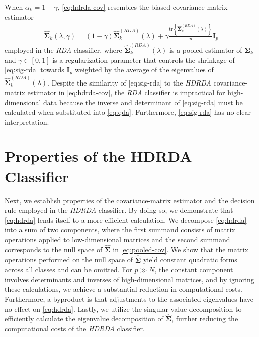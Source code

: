 \documentclass[]{interact}\usepackage[]{graphicx}\usepackage[]{color}
\newcommand{\tr}{\text{tr}}
\begin{document}
When $\alpha_k = 1 - \gamma$, \eqref{eq:hdrda-cov} resembles the biased covariance-matrix estimator
\begin{align}
    \widehat{\bm \Sigma}_k(\lambda, \gamma) = (1 - \gamma) \widehat{\bm \Sigma}_k^{(RDA)}(\lambda) + \gamma \frac{\tr\left\{\widehat{\bm \Sigma}_k^{(RDA)}(\lambda)\right\}}{p} \bm I_p \label{eq:sig-rda}
\end{align}
employed in the \emph{RDA} classifier, where $\widehat{\bm
  \Sigma}_k^{(RDA)}(\lambda)$ is a pooled estimator of $\bm \Sigma_k$ and
$\gamma \in [0, 1]$ is a regularization parameter that controls the shrinkage of
\eqref{eq:sig-rda} towards $\bm I_p$ weighted by the average of the eigenvalues
of $\widehat{\bm \Sigma}_k^{(RDA)}(\lambda)$. Despite the similarity of
\eqref{eq:sig-rda} to the \emph{HDRDA} covariance-matrix estimator in
\eqref{eq:hdrda-cov}, the \emph{RDA} classifier is impractical for
high-dimensional data because the inverse and determinant of \eqref{eq:sig-rda}
must be calculated when substituted into \eqref{eq:qda}. Furthermore,
\eqref{eq:sig-rda} has no clear interpretation.

\section{Properties of the HDRDA Classifier}
\label{sec:hdrda-properties}

Next, we establish properties of the covariance-matrix estimator and the
decision rule employed in the \emph{HDRDA} classifier. By doing so, we
demonstrate that \eqref{eq:hdrda} lends itself to a more efficient
calculation. We decompose \eqref{eq:hdrda} into a sum of two components, where
the first summand consists of matrix operations applied to low-dimensional
matrices and the second summand corresponds to the null space of $\widehat{\bm
  \Sigma}$ in \eqref{eq:pooled-cov}. We show that the matrix operations
performed on the null space of $\widehat{\bm \Sigma}$ yield constant quadratic
forms across all classes and can be omitted. For $p \gg N$, the constant
component involves determinants and inverses of high-dimensional matrices, and
by ignoring these calculations, we achieve a substantial reduction in
computational costs. Furthermore, a byproduct is that adjustments to the
associated eigenvalues have no effect on \eqref{eq:hdrda}. Lastly, we utilize
the singular value decomposition to efficiently calculate the eigenvalue
decomposition of $\widehat{\bm \Sigma}$, further reducing the computational
costs of the \emph{HDRDA} classifier.
\end{document}
